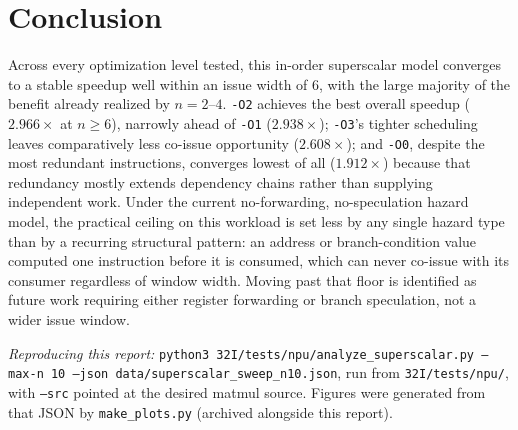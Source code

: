 \documentclass[11pt]{article}
\begin{document}
\section{Conclusion}

Across every optimization level tested, this in-order superscalar model
converges to a stable speedup well within an issue width of $6$, with the
large majority of the benefit already realized by $n=2$--$4$. \texttt{-O2}
achieves the best overall speedup ($2.966\times$ at $n \ge 6$), narrowly
ahead of \texttt{-O1} ($2.938\times$); \texttt{-O3}'s tighter scheduling
leaves comparatively less co-issue opportunity ($2.608\times$); and
\texttt{-O0}, despite the most redundant instructions, converges lowest of
all ($1.912\times$) because that redundancy mostly extends dependency
chains rather than supplying independent work. Under the current
no-forwarding, no-speculation hazard model, the practical ceiling on this
workload is set less by any single hazard type than by a recurring
structural pattern: an address or branch-condition value computed one
instruction before it is consumed, which can never co-issue with its
consumer regardless of window width. Moving past that floor is identified
as future work requiring either register forwarding or branch speculation,
not a wider issue window.

\vspace{1em}
\noindent\textit{Reproducing this report:} \texttt{python3
32I/tests/npu/analyze\_superscalar.py --max-n 10 --json
data/superscalar\_sweep\_n10.json}, run from
\texttt{32I/tests/npu/}, with \texttt{--src} pointed at the desired matmul
source. Figures were generated from that JSON by
\texttt{make\_plots.py} (archived alongside this report).
\end{document}
